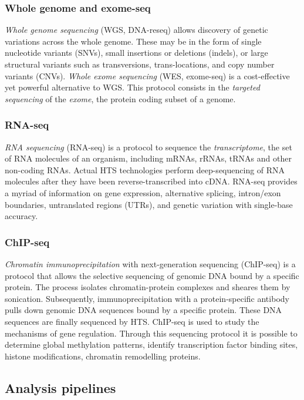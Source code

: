 \subsubsection{Whole genome and exome-seq}

\emph{Whole genome sequencing} (WGS, DNA-reseq) allows discovery of genetic variations across the whole genome.
These may be in the form of single nucleotide variants (SNVs), small insertions or deletions (indels), or large structural variants such as transversions, trans-locations, and copy number variants (CNVs).
\emph{Whole exome sequencing} (WES, exome-seq) is a cost-effective yet powerful alternative to WGS.
This protocol consists in the \emph{targeted sequencing} of the \emph{exome}, \ie the protein coding subset of a genome.

\subsubsection{RNA-seq}
\emph{RNA sequencing} (RNA-seq) is a protocol to sequence the \emph{transcriptome}, \ie the set of RNA molecules of an organism, including mRNAs, rRNAs, tRNAs and other non-coding RNAs.
Actual HTS technologies perform deep-sequencing of RNA molecules after they have been reverse-transcribed into cDNA.
RNA-seq provides a myriad of information on gene expression, alternative splicing, intron/exon boundaries, untranslated regions (UTRs), and genetic variation with single-base accuracy.

\subsubsection{ChIP-seq}
\emph{Chromatin immunoprecipitation} with next-generation sequencing (ChIP-seq) is a protocol that allows the selective sequencing of genomic DNA bound by a specific protein.
The process isolates chromatin-protein complexes and sheares them by sonication.
Subsequently, immunoprecipitation with a protein-specific antibody pulls down genomic DNA sequences bound by a specific protein.
These DNA sequences are finally sequenced by HTS.
ChIP-seq is used to study the mechanisms of gene regulation.
Through this sequencing protocol it is possible to determine global methylation patterns, identify transcription factor binding sites, histone modifications, chromatin remodelling proteins.

\subsection{Analysis pipelines}

